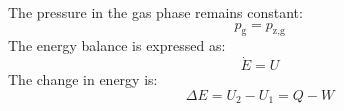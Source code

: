The pressure in the gas phase remains constant:  
\[
p_{\text{g}} = p_{\text{z,g}}
\]  
The energy balance is expressed as:  
\[
\dot{E} = U
\]  
The change in energy is:  
\[
\Delta E = U_2 - U_1 = Q - W
\]
